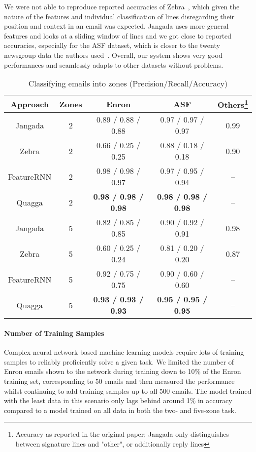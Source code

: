 \documentclass{llncs}
\begin{document}
We were not able to reproduce reported accuracies of Zebra~\cite{zebra}, which given the nature of the features and individual classification of lines disregarding their position and context in an email was expected.
Jangada uses more general features and looks at a sliding window of lines and we got close to reported accuracies, especially for the ASF dataset, which is closer to the twenty newsgroup data the authors used~\cite{zones}.
Overall, our system shows very good performances and seamlessly adapts to other datasets without problems.

\begin{table}
	\centering
	\caption{Classifying emails into zones (Precision/Recall/Accuracy)}
	\label{tab:results-comp}
	\begin{tabular*}{\textwidth}{@{\extracolsep{\fill}}ccccc}
		\toprule
		Approach                & Zones & Enron & ASF & Others\footnote{Accuracy as reported in the original paper; Jangada only distinguishes between signature lines and "other", or additionally reply lines}\\ \midrule
		Jangada\cite{signature} & 2 & 0.89 / 0.88 / 0.88 & 0.97 / 0.97 / 0.97 & 0.99 \\
		Zebra\cite{zones}       & 2 & 0.66 / 0.25 / 0.25 & 0.88 / 0.18 / 0.18 & 0.90 \\
		FeatureRNN              & 2 & 0.98 / 0.98 / 0.97 & 0.97 / 0.95 / 0.94 & --   \\
		Quagga                  & 2 & \textbf{0.98 / 0.98 / 0.98} & \textbf{0.98 / 0.98 / 0.98} & --   \\
		\midrule
		Jangada\cite{signature} & 5 & 0.82 / 0.85 / 0.85 & 0.90 / 0.92 / 0.91 & 0.98 \\
		Zebra\cite{zones}       & 5 & 0.60 / 0.25 / 0.24 & 0.81 / 0.20 / 0.20 & 0.87 \\
		FeatureRNN              & 5 & 0.92 / 0.75 / 0.75 & 0.90 / 0.60 / 0.60 & -- \\
		Quagga                  & 5 & \textbf{0.93 / 0.93 / 0.93} & \textbf{0.95 / 0.95 / 0.95} & -- \\
		\bottomrule	
	\end{tabular*}
\end{table}

\paragraph{Number of Training Samples}
Complex neural network based machine learning models require lots of training samples to reliably proficiently solve a given task.
We limited the number of Enron emails shown to the network during training down to 10\% of the Enron training set, corresponding to 50 emails and then measured the performance whilst continuing to add training samples up to all 500 emails.
The model trained with the least data in this scenario only lags behind around 1\% in accuracy compared to a model trained on all data in both the two- and five-zone task.
\end{document}
